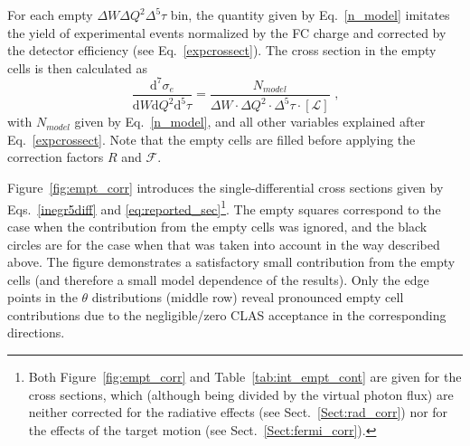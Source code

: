 
For each empty $\Delta W\Delta Q^2\Delta^{5}\tau$ bin, the quantity given by Eq.~\eqref{n_model} imitates the yield of experimental events normalized by the FC charge and corrected by the detector efficiency (see Eq.~\eqref{expcrossect}). The cross section in the empty cells is then calculated as
\begin{equation}
\frac{\textrm{d}^{7}\sigma_{e}}{\textrm{d}W\textrm{d}Q^{2}\textrm{d}^{5}\tau} = \frac{N_{model}}{
\Delta W \! \cdot \! \Delta Q^{2} \! \cdot \! \Delta^{5} \tau \! \cdot \! \left [ \mathcal{L} \right ] }\textrm{ ,}
\label{cr_sect_empt}
\end{equation}
with $N_{model}$ given by Eq.~\eqref{n_model}, and all other variables explained after Eq.~\eqref{expcrossect}. Note that the empty cells are filled before applying the correction factors $R$ and $\mathcal{F}$.


Figure~\ref{fig:empt_corr} introduces the single-differential cross sections given by Eqs.~\eqref{inegr5diff} and \eqref{eq:reported_sec}\footnote[1]{Both Figure~\ref{fig:empt_corr} and Table~\ref{tab:int_empt_cont} are given for the cross sections, which (although being divided by the virtual photon flux) are neither corrected for the radiative effects (see Sect.~\ref{Sect:rad_corr}) nor for the effects of the target motion (see Sect.~\ref{Sect:fermi_corr}). }. The empty squares correspond to the case when the contribution from the empty cells was ignored, and the black circles are for the case when that was taken into account in the way described above. The figure demonstrates a satisfactory small contribution from the empty cells (and therefore a small model dependence of the results). Only the edge points in the $\theta$ distributions (middle row) reveal pronounced empty cell contributions due to the negligible/zero CLAS acceptance in the corresponding directions.


